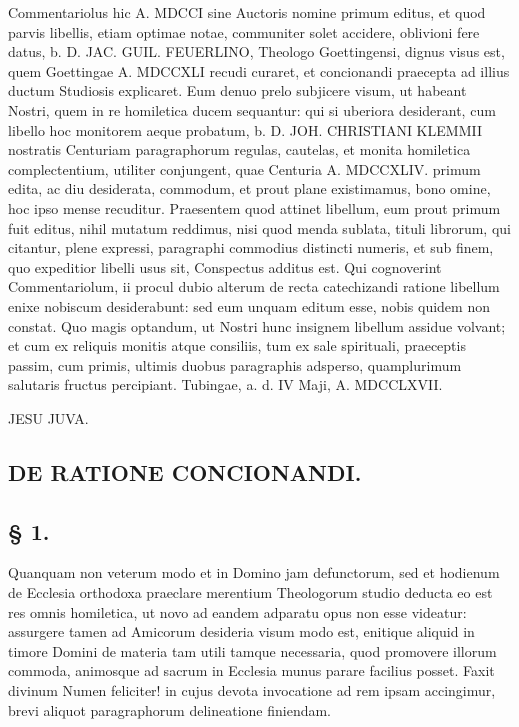 Commentariolus hic A. MDCCI sine Auctoris nomine primum editus, et quod parvis libellis, etiam optimae notae, communiter solet accidere, oblivioni fere datus, b. D. JAC. GUIL. FEUERLINO, Theologo Goettingensi, dignus visus est, quem Goettingae A. MDCCXLI recudi curaret, et concionandi praecepta ad illius ductum Studiosis explicaret. Eum denuo prelo subjicere visum, ut habeant Nostri, quem in re homiletica ducem sequantur: qui si uberiora desiderant, cum libello hoc monitorem aeque probatum, b. D. JOH. CHRISTIANI KLEMMII nostratis Centuriam paragraphorum regulas, cautelas, et monita homiletica complectentium, utiliter conjungent, quae Centuria A. MDCCXLIV. primum edita, ac diu desiderata, commodum, et prout plane existimamus, bono omine, hoc ipso mense recuditur. Praesentem quod attinet libellum, eum prout primum fuit editus, nihil mutatum reddimus, nisi quod menda sublata, tituli librorum, qui citantur, plene expressi, paragraphi commodius distincti numeris, et sub finem, quo expeditior libelli usus sit, Conspectus additus est. Qui cognoverint Commentariolum, ii procul dubio alterum de recta catechizandi ratione libellum enixe nobiscum desiderabunt: sed eum unquam editum esse, nobis quidem non constat. Quo magis optandum, ut Nostri hunc insignem libellum assidue volvant; et cum ex reliquis monitis atque consiliis, tum ex sale spirituali, praeceptis passim, cum primis, ultimis duobus paragraphis adsperso, quamplurimum salutaris fructus percipiant. Tubingae, a. d. IV Maji, A. MDCCLXVII.

\begin{center}
JESU JUVA.
\end{center}

\subsection*{DE RATIONE CONCIONANDI.}

\subsection*{§ 1.}

Quanquam non veterum modo et in Domino jam defunctorum, sed et hodienum de Ecclesia orthodoxa praeclare merentium Theologorum studio deducta eo est res omnis homiletica, ut novo ad eandem adparatu opus non esse videatur: assurgere tamen ad Amicorum desideria visum modo est, enitique aliquid in timore Domini de materia tam utili tamque necessaria, quod promovere illorum commoda, animosque ad sacrum in Ecclesia munus parare facilius posset. Faxit divinum Numen feliciter! in cujus devota invocatione ad rem ipsam accingimur, brevi aliquot paragraphorum delineatione finiendam.

